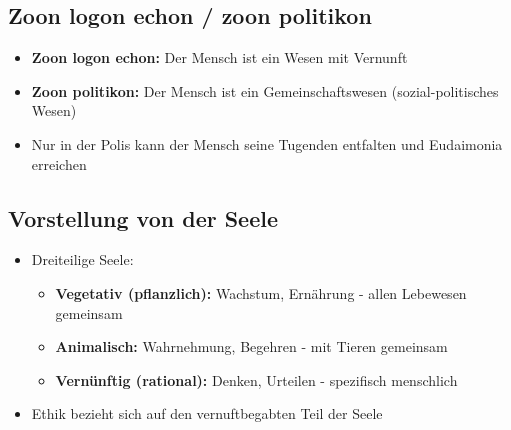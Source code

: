 \subsection{Zoon logon echon / zoon politikon}
\begin{itemize}
    \item \textbf{Zoon logon echon:} Der Mensch ist ein Wesen mit Vernunft
    \item \textbf{Zoon politikon:} Der Mensch ist ein Gemeinschaftswesen (sozial-politisches Wesen)
    \item Nur in der Polis kann der Mensch seine Tugenden entfalten und Eudaimonia erreichen
\end{itemize}

\subsection{Vorstellung von der Seele}
\begin{itemize}
    \item Dreiteilige Seele:
    \begin{itemize}
        \item \textbf{Vegetativ (pflanzlich):} Wachstum, Ernährung - allen Lebewesen gemeinsam
        \item \textbf{Animalisch:} Wahrnehmung, Begehren - mit Tieren gemeinsam
        \item \textbf{Vernünftig (rational):} Denken, Urteilen - spezifisch menschlich 
    \end{itemize}
    \item Ethik bezieht sich auf den vernuftbegabten Teil der Seele
\end{itemize}


